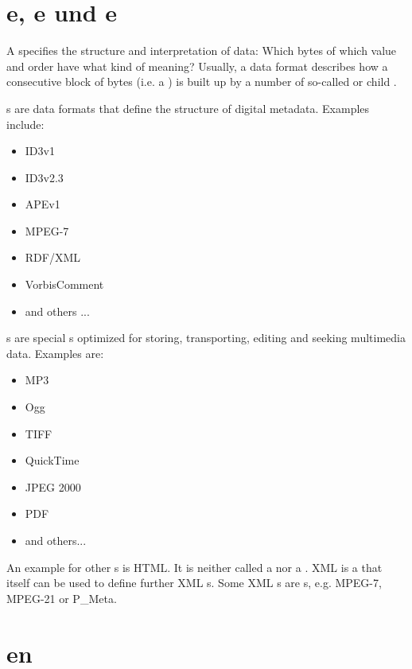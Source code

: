 \section{\TERMdataFormat{}e, \TERMmetadataFormat{}e und \TERMcontainerFormat{}e}
\label{sec:DataFormats}

A \TERMdataFormat{} specifies the structure and interpretation
of data: Which bytes of which value and order have what kind of meaning?
Usually, a data format describes how a consecutive block of bytes (i.e. a \TERMdataBlock{}) is built up by a number of so-called \TERMfield{} or child \TERMdataBlock{}.

\TERMmetadataFormat{}s are data formats that define the structure of digital metadata. Examples include:
\begin{itemize}
	\item ID3v1
	\item ID3v2.3
	\item APEv1
	\item MPEG-7
	\item RDF/XML
	\item VorbisComment
	\item and others ...
\end{itemize}

\TERMcontainerFormat{}s are special \TERMdataFormat{}s optimized for storing, transporting, editing and seeking multimedia \TERMpayload{} data. Examples are:
\begin{itemize}
	\item MP3
	\item Ogg
	\item TIFF
	\item QuickTime
	\item JPEG 2000
	\item PDF
	\item and others...
\end{itemize}

An example for other \TERMdataFormat{}s is HTML. It is neither called a \TERMmetadataFormat{} nor a \TERMcontainerFormat{}. XML is a \TERMdataFormat{} that itself can be used to define further XML \TERMdataFormat{}s. Some XML \TERMdataFormat{}s are \TERMmetadataFormat{}s, e.g. MPEG-7, MPEG-21 or P\_Meta.


\section{\TERMtransformation{}en}
\label{sec:DataTransformations}

